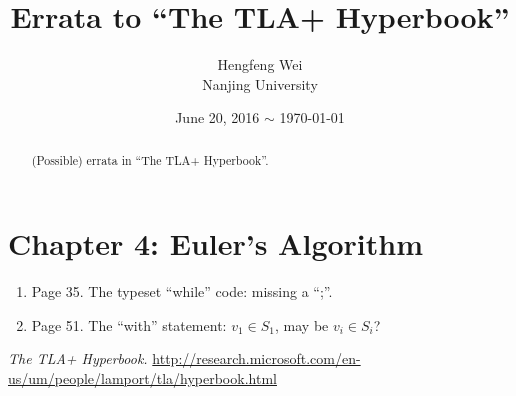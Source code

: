\documentclass{article}
\title{Errata to ``The TLA+ Hyperbook''}
\author{Hengfeng Wei \\ Nanjing University}
\date{June 20, 2016 $\sim$ \today}
\begin{document}
\maketitle


\begin{abstract}
  (Possible) errata in ``The TLA+ Hyperbook''.
\end{abstract}

\section{Chapter 4: Euler's Algorithm}

\begin{enumerate}
  \item Page 35. The typeset ``while'' code: missing a ``;''.
  \item Page 51. The ``with'' statement: $v_{1} \in S_{1}$, may be $v_{i} \in S_{i}$? 
\end{enumerate}

\begin{thebibliography}{9}
   \emph{The TLA+ Hyperbook.} \url{http://research.microsoft.com/en-us/um/people/lamport/tla/hyperbook.html}
\end{thebibliography}
\end{document}
